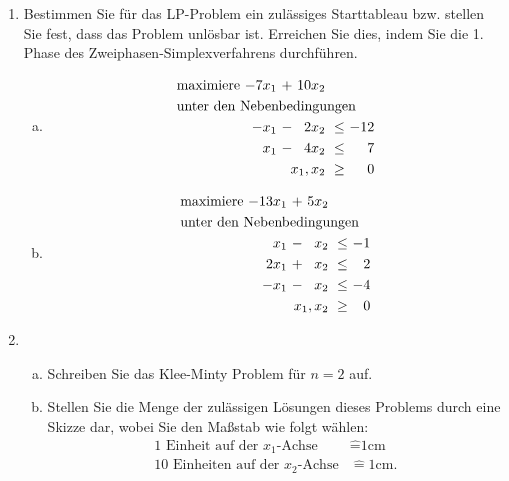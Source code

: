 \documentclass[11pt, a4paper]{article}
\begin{document}
\begin{enumerate}[\bfseries A:]
\begin{enumerate}[\bfseries 1.]

\item Bestimmen Sie für das LP-Problem ein zulässiges Starttableau bzw. stellen Sie fest, dass das Problem unlösbar ist. Erreichen Sie dies, indem Sie die 1. Phase des Zweiphasen-Simplexverfahrens durchführen.
\begin{enumerate}[a)]
	\item \begin{align*}
	\begin{alignedat}{4}
	& \text{maximiere } & -7x_1 &\ + &\ 10x_2 & & \\
	& \rlap{unter den Nebenbedingungen} & & & & & \\
	&& -x_1 &\ - &\ 2x_2 &\ \leq &\ -12 \\
	&&  x_1 &\ - &\ 4x_2 &\ \leq &\   7 \\
	&&&& \llap{$x_1,x_2$} &\ \geq &\ 0
	\end{alignedat}
	\end{align*}
	
	\item \begin{align*}
	\begin{alignedat}{4}
	& \text{maximiere } & -13x_1 &\ + &\ 5x_2 & & \\
	& \rlap{unter den Nebenbedingungen} & & & & & \\
	&&  x_1 &\ - &\ x_2 &\ \leq &\ -1 \\
	&& 2x_1 &\ + &\ x_2 &\ \leq &\  2 \\
	&& -x_1 &\ - &\ x_2 &\ \leq &\ -4 \\
	&&&& \llap{$x_1,x_2$} &\ \geq &\ 0
	\end{alignedat}
	\end{align*}
\end{enumerate}

\item \begin{enumerate}[a)]
	\item Schreiben Sie das Klee-Minty Problem für $n=2$ auf. 
	
	\item Stellen Sie die Menge der zulässigen Lösungen dieses Problems durch eine Skizze dar, wobei Sie den Maßstab wie folgt wählen:
	\begin{align*}
	\text{1 Einheit auf der $x_1$-Achse} &\mathrel{\widehat{=}} \text{1cm} \\
	\text{10 Einheiten auf der $x_2$-Achse} &\mathrel{\widehat{=}} \text{1cm}.
	\end{align*}
	

\end{enumerate}
\end{enumerate}
\end{enumerate}
\end{document}

